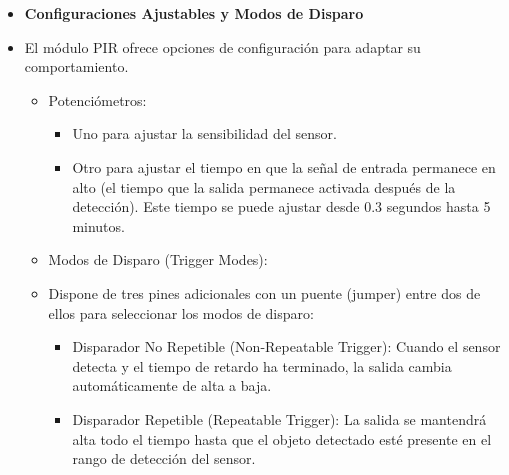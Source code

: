 \documentclass{report}
\begin{document}
\begin{itemize}
    \item \textbf{Configuraciones Ajustables y Modos de Disparo}
    \item El módulo PIR ofrece opciones de configuración para adaptar su comportamiento.
    \begin{itemize}
        \item Potenciómetros:
        \begin{itemize}
            \item Uno para ajustar la sensibilidad del sensor.
            \item Otro para ajustar el tiempo en que la señal de entrada permanece en alto (el tiempo que la salida permanece activada después 
            de la detección). Este tiempo se puede ajustar desde 0.3 segundos hasta 5 minutos.
        \end{itemize}

        \item Modos de Disparo (Trigger Modes):
        \item Dispone de tres pines adicionales con un puente (jumper) entre dos de ellos para seleccionar los modos de disparo:
        \begin{itemize}
            \item Disparador No Repetible (Non-Repeatable Trigger): Cuando el sensor detecta y el tiempo de retardo ha terminado, la salida cambia 
            automáticamente de alta a baja.
            \item Disparador Repetible (Repeatable Trigger): La salida se mantendrá alta todo el tiempo hasta que el objeto detectado esté presente 
            en el rango de detección del sensor.
        \end{itemize}
    \end{itemize}


\end{itemize}
\end{document}
